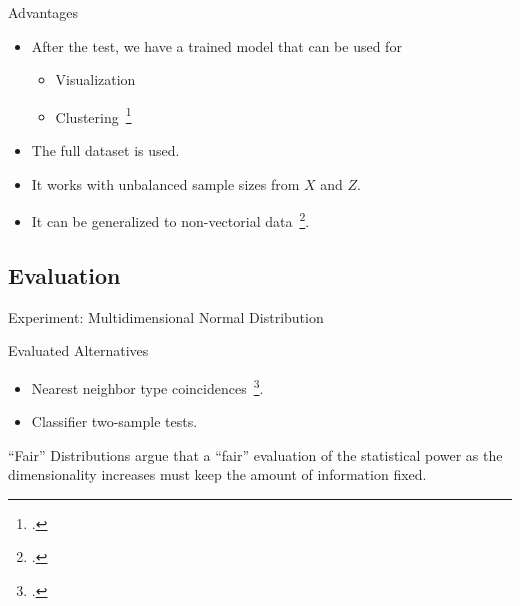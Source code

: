 \documentclass[10pt]{beamer}
\begin{document}
\begin{frame}{Advantages}
    \begin{itemize}
        \item After the test, we have a trained model that can be used for
            
            \begin{itemize}
                \item Visualization
                \item Clustering~\footcite{ultsch2005esom}
            \end{itemize}

        \item The full dataset is used.
        \item It works with unbalanced sample sizes from $X$ and $Z$.
        \item It can be generalized to non-vectorial data~\footcite{kohonen1982self}.
    \end{itemize}

\end{frame}

\subsection{Evaluation}

\begin{frame}{Experiment: Multidimensional Normal Distribution}
    \begin{block}{Evaluated Alternatives}
        \smallskip
        \begin{itemize}
            \item Nearest neighbor type coincidences~\footcite{Henze1988, Schilling1986b}.
            \item Classifier two-sample tests.
        \end{itemize}
    \end{block}
    \begin{block}{``Fair'' Distributions}
        \smallskip
        \cite{ramdas2015decreasing} argue that a ``fair'' evaluation of the
        statistical power as the dimensionality increases must keep the
        amount of information fixed.
    \end{block}

\end{frame}
\end{document}
